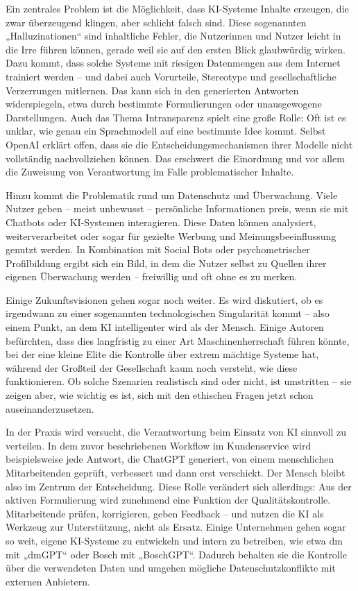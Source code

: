 \documentclass[utf8,biblatex]{bremerhaven_lni}
\begin{document}
Ein zentrales Problem ist die Möglichkeit, dass KI-Systeme Inhalte erzeugen, die zwar überzeugend klingen, aber schlicht falsch sind. Diese sogenannten „Halluzinationen“ sind inhaltliche Fehler, die Nutzerinnen und Nutzer leicht in die Irre führen können, gerade weil sie auf den ersten Blick glaubwürdig wirken. Dazu kommt, dass solche Systeme mit riesigen Datenmengen aus dem Internet trainiert werden – und dabei auch Vorurteile, Stereotype und gesellschaftliche Verzerrungen mitlernen. Das kann sich in den generierten Antworten widerspiegeln, etwa durch bestimmte Formulierungen oder unausgewogene Darstellungen. Auch das Thema Intransparenz spielt eine große Rolle: Oft ist es unklar, wie genau ein Sprachmodell auf eine bestimmte Idee kommt. Selbst OpenAI erklärt offen, dass sie die Entscheidungsmechanismen ihrer Modelle nicht vollständig nachvollziehen können. Das erschwert die Einordnung und vor allem die Zuweisung von Verantwortung im Falle problematischer Inhalte.

Hinzu kommt die Problematik rund um Datenschutz und Überwachung. Viele Nutzer geben – meist unbewusst – persönliche Informationen preis, wenn sie mit Chatbots oder KI-Systemen interagieren. Diese Daten können analysiert, weiterverarbeitet oder sogar für gezielte Werbung und Meinungsbeeinflussung genutzt werden. In Kombination mit Social Bots oder psychometrischer Profilbildung ergibt sich ein Bild, in dem die Nutzer selbst zu Quellen ihrer eigenen Überwachung werden – freiwillig und oft ohne es zu merken.

Einige Zukunftsvisionen gehen sogar noch weiter. Es wird diskutiert, ob es irgendwann zu einer sogenannten technologischen Singularität kommt – also einem Punkt, an dem KI intelligenter wird als der Mensch. Einige Autoren befürchten, dass dies langfristig zu einer Art Maschinenherrschaft führen könnte, bei der eine kleine Elite die Kontrolle über extrem mächtige Systeme hat, während der Großteil der Gesellschaft kaum noch versteht, wie diese funktionieren. Ob solche Szenarien realistisch sind oder nicht, ist umstritten – sie zeigen aber, wie wichtig es ist, sich mit den ethischen Fragen jetzt schon auseinanderzusetzen.

In der Praxis wird versucht, die Verantwortung beim Einsatz von KI sinnvoll zu verteilen. In dem zuvor beschriebenen Workflow im Kundenservice wird beispielsweise jede Antwort, die ChatGPT generiert, von einem menschlichen Mitarbeitenden geprüft, verbessert und dann erst verschickt. Der Mensch bleibt also im Zentrum der Entscheidung. Diese Rolle verändert sich allerdings: Aus der aktiven Formulierung wird zunehmend eine Funktion der Qualitätskontrolle. Mitarbeitende prüfen, korrigieren, geben Feedback – und nutzen die KI als Werkzeug zur Unterstützung, nicht als Ersatz. Einige Unternehmen gehen sogar so weit, eigene KI-Systeme zu entwickeln und intern zu betreiben, wie etwa dm mit „dmGPT“ oder Bosch mit „BoschGPT“. Dadurch behalten sie die Kontrolle über die verwendeten Daten und umgehen mögliche Datenschutzkonflikte mit externen Anbietern.
\end{document}
